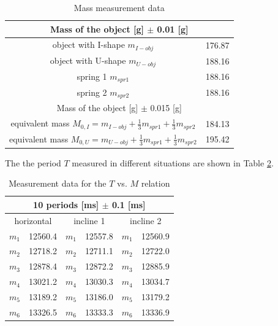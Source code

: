\begin{table}[H]
	\centering
	\begin{tabular}{|c|c|}
	\hline
	\multicolumn{2}{|c|}{Mass of the object [g] $\pm$ 0.01 [g]} \\ \hline
	object with I-shape $m_{I-obj}$  & 176.87 \\ \hline
	object with U-shape $m_{U-obj}$  & 188.16 \\ \hline
	spring 1 			$m_{spr1}$ & 188.16 \\ \hline
	spring 2 			$m_{spr2}$ & 188.16 \\ \hline \hline
	\multicolumn{2}{|c|}{Mass of the object [g] $\pm$ 0.015 [g]} \\ \hline 
	equivalent mass		$M_{0,I} = m_{I-obj} + \frac{1}{3} m_{spr1} + \frac{1}{3} m_{spr2} $ & 184.13 \\ \hline 
	equivalent mass		$M_{0,U} = m_{U-obj} + \frac{1}{3} m_{spr1} + \frac{1}{3} m_{spr2} $ & 195.42 \\ \hline 
	\end{tabular}
	\caption{Mass measurement data}
	\label{dataMass}
\end{table}


The the period $T$ measured in different situations are shown in Table \ref{dataTime}.

\begin{table}[H]
	\centering
	\begin{tabular}{|c|c||c|c||c|c|}
	\hline
	\multicolumn{6}{|c|}{10 periods [ms] $\pm$ 0.1 [ms]} \\ \hline
    \multicolumn{2}{|c||}{horizontal}  &
     \multicolumn{2}{|c||}{incline 1}  &
     \multicolumn{2}{|c|}{incline 2}  \\ \hline
	$m_1$ & 12560.4 & $m_1$ & 12557.8 & $m_1$ & 12560.9 \\ \hline
	$m_2$ & 12718.2 & $m_2$ & 12711.1 & $m_2$ & 12722.0 \\ \hline
	$m_3$ & 12878.4 & $m_3$ & 12872.2 & $m_3$ & 12885.9 \\ \hline
	$m_4$ & 13021.2 & $m_4$ & 13030.3 & $m_4$ & 13034.7 \\ \hline
	$m_5$ & 13189.2 & $m_5$ & 13186.0 & $m_5$ & 13179.2 \\ \hline
	$m_6$ & 13326.5 & $m_6$ & 13333.3 & $m_6$ & 13336.9 \\ \hline
	\end{tabular}
	\caption{Measurement data for the $T$ vs. $M$ relation}
	\label{dataTime}
\end{table}
